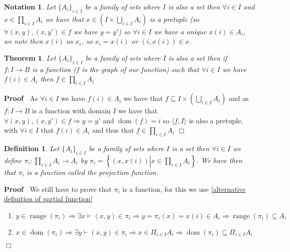 \documentclass{book}
\newcommand{\tmop}[1]{\ensuremath{\operatorname{#1}}}
\newenvironment{proof}{\noindent\textbf{Proof\ }}{\hspace*{\fill}$\Box$\medskip}
\newtheorem{definition}{Definition}
{\theorembodyfont{\rmfamily}\newtheorem{example}{Example}}
\newtheorem{notation}{Notation}
{\theorembodyfont{\rmfamily}\newtheorem{note}{Note}}
\newtheorem{theorem}{Theorem}
\begin{document}
{{\begin{notation}
  Let $\{ A_i \}_{i \in I}$ be a family of sets where $I$ is also a set then
  $\forall i \in I$ and $x \in \prod_{i \in I} A_i$ we have that $x \in \left(
  I \times \bigcup_{i \in I} A_i \right)$ is a pretuple (so $\forall (x, y),
  (x, y') \in f$ we have $y = y'$) so $\forall i \in I$ we have a unique $x
  (i) \in A_i$, we note then $x (i)$ as $x_i$, so $x_i = x (i)$ or $(i, x (i))
  \in x$.
\end{notation}

\begin{theorem}
  \label{condition to belong to a product of sets}Let $\{ A_i \}_{i \in I}$ be
  a family of sets where $I$ is also a set then if $f : I \rightarrow B$ is a
  function ($f$ is the graph of our function) such that $\forall i \in I$ we
  have $f (i) \in A_i$ then $f \in \prod_{i \in I} A_i$
\end{theorem}

\begin{proof}
  As $\forall i \in I$ we have $f (i) \in A_i$ we have that $f \subseteq I
  \times \left( \bigcup_{i \in I} A_i \right)$ and as $f : I \rightarrow B$ is
  a function with domain $I$ we have that $\forall (x, y), (x, y') \in f
  \Rightarrow y = y'$ and $\tmop{dom} (f) = i$ so $\langle f, I \rangle$ is
  also a pretuple, with $\forall i \in I$ that $f (i) \in A_i$ and thus that
  $f \in \prod_{i \in I} A_i$
\end{proof}

\begin{definition}
  \label{projection function}{}{}Let
  $\{ A_i \}_{i \in I}$ be a family of sets where $I$ is a set then $\forall i
  \in I$ we define $\pi_i : \prod_{i \in I} A_i \rightarrow A_i$ by $\pi_i =
  \left\{ (x, x (i)) \left| x \in \prod_{i \in I} A_i \right. \right\}$. We
  have then that $\pi_i$ is a function called the projection function.
\end{definition}

\begin{proof}
  We still have to prove that $\pi_i$ is a function, for this we use
  \ref{alternative definition of partial function}
  \begin{enumerate}
    \item $y \in \tmop{range} (\pi_i) \Rightarrow \exists x \vdash (x, y) \in
    \pi_i \Rightarrow y = \pi_i (x) = x (i) \in A_i \Rightarrow \tmop{range}
    (\pi_i) \subseteq A_i$
    
    \item $x \in \tmop{dom} (\pi_i) \Rightarrow \exists y \vdash (x, y) \in
    \pi_i \Rightarrow x \in \Pi_{i \in I} A_i \Rightarrow \tmop{dom} (\pi_i)
    \subseteq \Pi_{i \in I} A_i$
    

\end{enumerate}
\end{proof}}}
\end{document}
